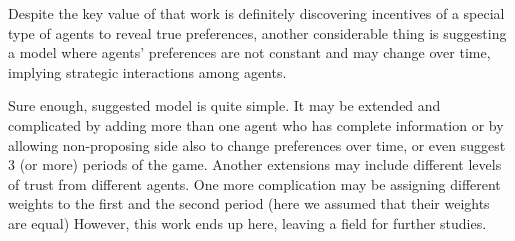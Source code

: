 \documentclass[a4paper]{article} %
\begin{document}
\hfill
\break
Despite the key value of that work is definitely discovering incentives of a special type of agents to reveal true preferences, another considerable thing is suggesting a model where agents' preferences are not constant and may change over time, implying strategic interactions among agents.

\hfill
\break
Sure enough, suggested model is quite simple. It may be extended and complicated by adding more than one agent who has complete information or by allowing non-proposing side also to change preferences over time, or even suggest 3 (or more) periods of the game. Another extensions may include different levels of trust from different agents. One more complication may be assigning different weights to the first and the second period (here we assumed that their weights are equal) However, this work ends up here, leaving a field for further studies.  
\end{document}
